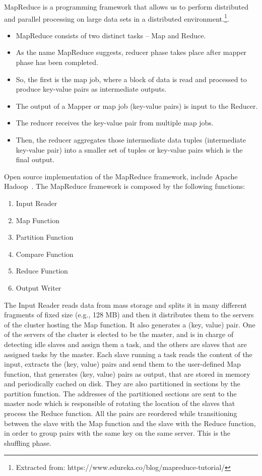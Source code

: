 MapReduce is a programming framework that allows us to perform distributed and parallel processing on large data sets in a distributed environment.\footnote{Extracted from: https://www.edureka.co/blog/mapreduce-tutorial/}.
\begin{itemize}
	\item MapReduce consists of two distinct tasks – Map and Reduce.
	\item As the name MapReduce suggests, reducer phase takes place after mapper phase has been completed.
	\item So, the first is the map job, where a block of data is read and processed to produce key-value pairs as intermediate outputs.
	\item The output of a Mapper or map job (key-value pairs) is input to the Reducer.
	\item The reducer receives the key-value pair from multiple map jobs.
	\item Then, the reducer aggregates those intermediate data tuples (intermediate key-value pair) into a smaller set of tuples or key-value pairs which is the final output.
\end{itemize}

Open source implementation of the MapReduce framework, include Apache Hadoop~\cite{misc:ApacheHadoop}. 
The MapReduce framework is composed by the following functions:
\begin{enumerate}
	\item Input Reader
	\item Map Function
	\item Partition Function
	\item Compare Function
	\item Reduce Function
	\item Output Writer
\end{enumerate}

The Input Reader reads data from mass storage and splits it in many different fragments of fixed size (e.g., 128 MB) and then it distributes them to the servers of the cluster hosting the Map function. It also generates a (key, value) pair. One of the servers of the cluster is elected to be the master, and is in charge of detecting idle slaves and assign them a task, and the others are slaves that are assigned tasks by the master. Each slave running a task reads the content of the input, extracts the (key, value) pairs and send them to the user-defined Map function, that generates (key, value) pairs as output, that are stored in memory and periodically cached on disk. They are also partitioned in sections by the partition function. The addresses of the partitioned sections are sent to the master node which is responsible of rotating the location of the slaves that process the Reduce function. All the pairs are reordered while transitioning between the slave with the Map function and the slave with the Reduce function, in order to group pairs with the same key on the same server. This is the shuffling phase. 

